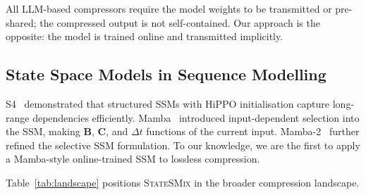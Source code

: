 \documentclass[10pt,twocolumn]{article}
\newcommand{\ssmcomp}{\textsc{StateSMix}}
\begin{document}
All LLM-based compressors require the model weights to be transmitted
or pre-shared; the compressed output is not self-contained.  Our
approach is the opposite: the model is trained online and transmitted
implicitly.

\subsection{State Space Models in Sequence Modelling}

S4~\citep{gu2021s4} demonstrated that structured SSMs with HiPPO
initialisation capture long-range dependencies efficiently.
Mamba~\citep{gu2023mamba} introduced input-dependent selection into
the SSM, making $\mathbf{B}$, $\mathbf{C}$, and $\Delta t$ functions
of the current input.  Mamba-2~\citep{dao2024mamba2} further refined
the selective SSM formulation.  To our knowledge, we are the first to
apply a Mamba-style online-trained SSM to lossless compression.

Table~\ref{tab:landscape} positions \ssmcomp{} in the broader
compression landscape.
\end{document}
